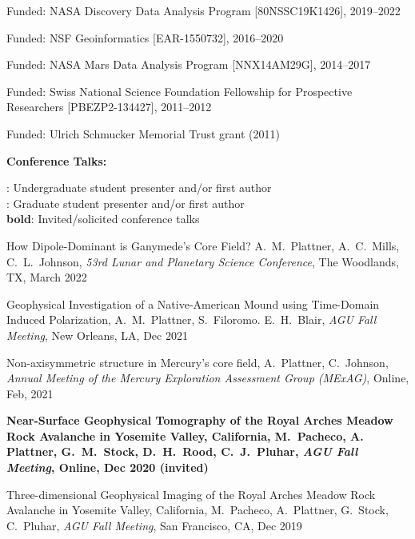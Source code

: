 \documentclass[10pt]{article}
\begin{document}
\spcp
Funded: NASA Discovery Data Analysis Program [80NSSC19K1426], 2019--2022

\spcp
  Funded: NSF Geoinformatics
  [EAR-1550732],
  2016--2020

 \spcp 
Funded: NASA Mars Data Analysis Program [NNX14AM29G], 2014--2017

\spcp Funded: Swiss National Science Foundation Fellowship for Prospective Researchers
[PBEZP2-134427], 2011--2012

\spcp
Funded: Ulrich Schmucker Memorial Trust grant (2011)

\spc

\textbf{\tsize Conference Talks:}

\spcp
\ug: Undergraduate student presenter and/or first author\\
\gr: Graduate student presenter and/or first author\\
\textbf{bold}: Invited/solicited conference talks

\spcp
\hspace{-0.4cm} \gr \hspace{-0.03cm} How Dipole-Dominant is Ganymede’s Core Field? A.~M.~Plattner, A.~C.~Mills, C.~L.~Johnson, \emph{53rd Lunar and Planetary Science Conference},
The Woodlands, TX, March 2022


\spcp
Geophysical Investigation of a Native-American Mound using Time-Domain Induced Polarization, A.~M.~Plattner, S.~Filoromo. E.~H.~Blair, \emph{AGU Fall Meeting}, New Orleans, LA, Dec 2021


\spcp
Non-axisymmetric structure in Mercury's core field, A.~Plattner, C.~Johnson, \emph{Annual Meeting of the Mercury Exploration Assessment Group (MExAG)}, Online, Feb, 2021

\spcp
\hspace{-0.4cm} \gr \hspace{-0.03cm} \textbf{Near-Surface Geophysical Tomography of the Royal Arches Meadow Rock Avalanche in Yosemite Valley, California, M.~Pacheco, A. Plattner, G.~M.~Stock, D.~H.~Rood, C.~J.~Pluhar, \emph{AGU Fall Meeting}, Online, Dec 2020 (invited)}

\spcp
\hspace{-0.4cm} \gr \hspace{-0.03cm} Three-dimensional Geophysical Imaging of the Royal Arches Meadow Rock Avalanche in Yosemite Valley, California, M.~Pacheco, A.~Plattner, G.~Stock, C.~Pluhar, \emph{AGU Fall Meeting}, San Francisco, CA, Dec 2019
\end{document}

